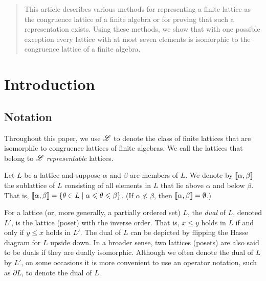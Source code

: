 \begin{abstract}
  This article describes various methods for representing a
  finite lattice as the congruence lattice of a finite algebra or for proving
  that such a representation exists. Using these methods, we show that with one
  possible exception every lattice with at most seven elements is isomorphic to
  the congruence lattice of a finite algebra.
\end{abstract}


\maketitle


\section{Introduction}
\label{sec:intro}




\subsection{Notation}

Throughout this paper, we use $\mathscr{L}$ to denote the class of finite lattices that
are isomorphic to congruence lattices of finite algebras. 
We call the lattices that belong to $\mathscr{L}$ \emph{representable} lattices. 

Let $L$ be a lattice and suppose $\alpha$ and $\beta$ are members of $L$.  
We denote by $\llbracket \alpha, \beta \rrbracket$ the sublattice of $L$ consisting of all elements in $L$
that lie above $\alpha$ and below $\beta$.  
That is, 
$\llbracket \alpha, \beta \rrbracket = 
\{\theta \in L \mid \alpha \leqslant \theta \leqslant \beta\}$.
(If $\alpha \nleq \beta$, then $\llbracket \alpha, \beta \rrbracket = \emptyset$.)

For a lattice (or, more generally, a partially ordered set) 
$L$, the \emph{dual} of $L$, denoted
$L'$, is the lattice (poset) with the inverse order. That is, 
$x \leq y$ holds in $L$ if and only if $y \leq x$ holds in $L'$. 
The dual of $L$ can be depicted by flipping the Hasse diagram
for $L$ upside down. 
In a broader sense, two lattices (posets) are also said to be duals if they are
dually isomorphic.
Although we often denote the dual of $L$ by $L'$, on some occasions it is more
convenient to use an operator notation, such as $\partial L$, to denote the dual of
$L$. 

